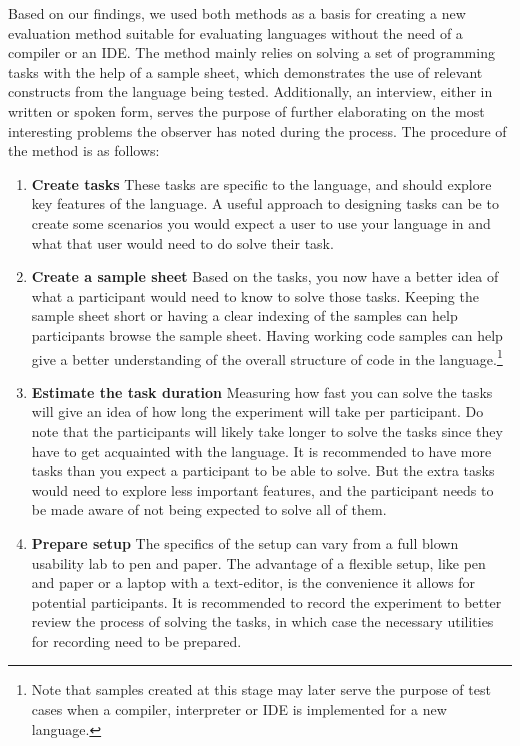 \documentclass[preprint,10pt]{sigplanconf}
\begin{document}
Based on our findings, we used both methods as a basis for creating a new evaluation method suitable for evaluating languages without the need of a compiler or an IDE. The method mainly relies on solving a set of programming tasks with the help of a sample sheet, which demonstrates the use of relevant constructs from the language being tested. Additionally, an interview, either in written or spoken form, serves the purpose of further elaborating on the most interesting problems the observer has noted during the process. The procedure of the method is as follows:

\begin{enumerate}
\item \textbf{Create tasks} These tasks are specific to the language, and should explore key features of the language. A useful approach to designing tasks can be to create some scenarios you would expect a user to use your language in and what that user would need to do solve their task.
\item \textbf{Create a sample sheet} Based on the tasks, you now have a better idea of what a participant would need to know to solve those tasks. Keeping the sample sheet short or having a clear indexing of the samples can help participants browse the sample sheet. Having working code samples can help give a better understanding of the overall structure of code in the language.\footnote{Note that samples created at this stage may later serve the purpose of test cases when a compiler, interpreter or IDE is implemented for a new language.}
\item \textbf{Estimate the task duration} Measuring how fast you can solve the tasks will give an idea of how long the experiment will take per participant. Do note that the participants will likely take longer to solve the tasks since they have to get acquainted with the language. It is recommended to have more tasks than you expect a participant to be able to solve. But the extra tasks would need to explore less important features, and the participant needs to be made aware of not being expected to solve all of them.
\item \textbf{Prepare setup} The specifics of the setup can vary from a full blown usability lab to pen and paper. The advantage of a flexible setup, like pen and paper or a laptop with a text-editor, is the convenience it allows for potential participants. It is recommended to record the experiment to better review the process of solving the tasks, in which case the necessary utilities for recording need to be prepared.

\end{enumerate}
\end{document}
